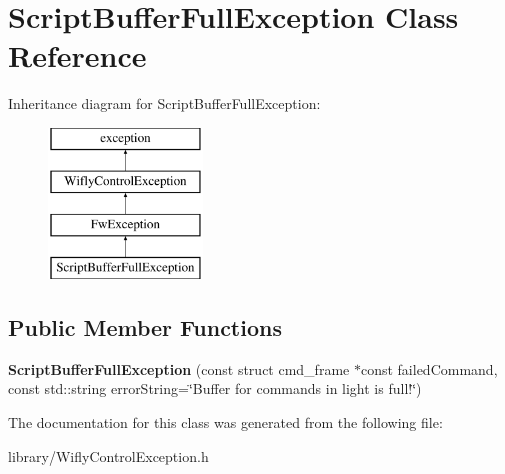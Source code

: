 \hypertarget{class_script_buffer_full_exception}{\section{Script\-Buffer\-Full\-Exception Class Reference}
\label{class_script_buffer_full_exception}
}
Inheritance diagram for Script\-Buffer\-Full\-Exception\-:\begin{figure}[H]
\begin{center}
\leavevmode
\includegraphics[height=4.000000cm]{class_script_buffer_full_exception}
\end{center}
\end{figure}
\subsection*{Public Member Functions}
\begin{DoxyCompactItemize}
\item 
\hypertarget{class_script_buffer_full_exception_ac7da5884fb0294041abf54a8b70283d2}{{\bfseries Script\-Buffer\-Full\-Exception} (const struct cmd\-\_\-frame $\ast$const failed\-Command, const std\-::string error\-String=\char`\"{}Buffer for commands in light is full!\char`\"{})}\label{class_script_buffer_full_exception_ac7da5884fb0294041abf54a8b70283d2}

\end{DoxyCompactItemize}


The documentation for this class was generated from the following file\-:\begin{DoxyCompactItemize}
\item 
library/Wifly\-Control\-Exception.\-h\end{DoxyCompactItemize}
